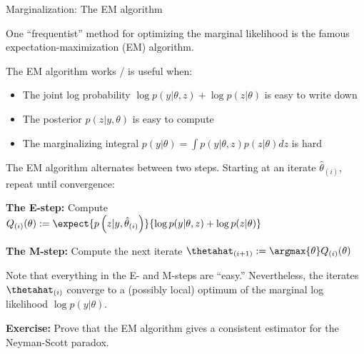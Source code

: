 \begin{frame}{Marginalization: The EM algorithm}

One ``frequentist'' method for optimizing the marginal likelihood is the
famous expectation-maximization (EM) algorithm.

The EM algorithm works / is useful when:

\begin{itemize}
    \item The joint log probability $\log p(y | \theta, z) + \log p(z | \theta)$ is easy to write down
    \item The posterior $p(z | y, \theta)$ is easy to compute
    \item The marginalizing integral $p(y | \theta) = \int p(y | \theta, z) p(z | \theta) dz$ is hard
\end{itemize}

\pause
\hrulefill

The EM algorithm alternates between two steps.  Starting at an iterate
$\hat\theta_{(i)}$, repeat until convergence:

\textbf{The E-step:}  Compute $Q_{(i)}(\theta) := \expect{p\left(z | y, \hat\theta_{(i)} \right)}{\log p(y | \theta, z) + \log p(z | \theta)}$

\textbf{The M-step:}  Compute the next iterate $\thetahat_{(i + 1)} := \argmax{\theta} Q_{(i)}(\theta)$

\pause
\hrulefill

Note that everything in the E- and M-steps are ``easy.''  Nevertheless, the
iterates $\thetahat_{(i)}$ converge to a (possibly local) optimum of the
marginal log likelihood $\log p(y | \theta)$.

\vspace{1em}

\pause

\textbf{Exercise: }  Prove that the EM algorithm gives a consistent estimator
for the Neyman-Scott paradox.

\end{frame}
